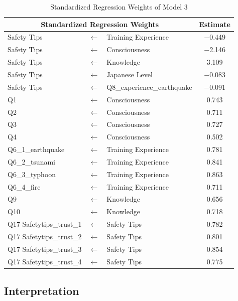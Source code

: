 \begin{table}[h]
\caption{Standardized Regression Weights of Model 3 }
\label{table22}
\centering
\begin{tabular}{|l|c|l|c|}
\hline
\multicolumn{3}{|c|}{Standardized Regression Weights} & Estimate \\
\hline
Safety Tips & $\longleftarrow$ & Training Experience & $-$0.449 \\
Safety Tips & $\longleftarrow$ & Consciousness & $-$2.146 \\
Safety Tips & $\longleftarrow$ & Knowledge & 3.109 \\
Safety Tips & $\longleftarrow$ & Japanese Level & $-$0.083\\
Safety Tips & $\longleftarrow$ & Q8\_experience\_earthquake & $-$0.091 \\
Q1 & $\longleftarrow$ & Consciousness & 0.743 \\
Q2 & $\longleftarrow$ & Consciousness & 0.711 \\
Q3 & $\longleftarrow$ & Consciousness & 0.727 \\
Q4 & $\longleftarrow$ & Consciousness & 0.502 \\
Q6\_1\_earthquake & $\longleftarrow$ & Training Experience & 0.781 \\
Q6\_2\_tsunami & $\longleftarrow$ & Training Experience & 0.841 \\
Q6\_3\_typhoon & $\longleftarrow$ & Training Experience & 0.863 \\
Q6\_4\_fire & $\longleftarrow$ & Training Experience & 0.711 \\
Q9 & $\longleftarrow$ & Knowledge & 0.656 \\
Q10 & $\longleftarrow$ & Knowledge & 0.718 \\
Q17 Safetytips\_trust\_1 & $\longleftarrow$ & Safety Tips & 0.782 \\
Q17 Safetytips\_trust\_2 & $\longleftarrow$ & Safety Tips & 0.801 \\
Q17 Safetytips\_trust\_3 & $\longleftarrow$ & Safety Tips & 0.854 \\
Q17 Safetytips\_trust\_4 & $\longleftarrow$ & Safety Tips & 0.775 \\
\hline
\end{tabular}
\end{table}




\subsection{Interpretation}


